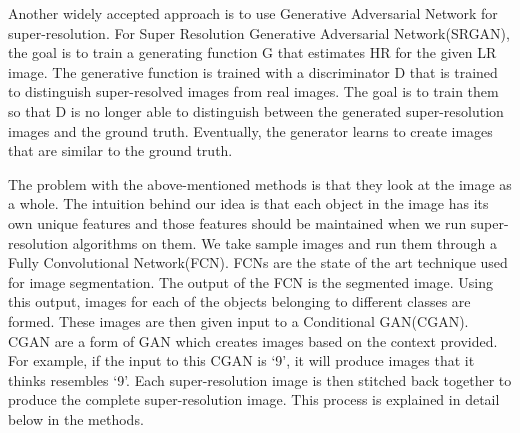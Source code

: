 Another widely accepted approach is to use Generative Adversarial Network for
super-resolution\cite{Ledig}. For Super Resolution Generative Adversarial Network(SRGAN),
the goal is to train a generating function G that estimates HR for the given LR
image. The generative function is trained with a discriminator D that is trained
to distinguish super-resolved images from real images. The goal is to train them
so that D is no longer able to distinguish between the generated
super-resolution images and the ground truth. Eventually, the generator learns
to create images that are similar to the ground truth.

The problem with the above-mentioned methods is that they look at the image as a
whole. The intuition behind our idea is that each object in the image has its
own unique features and those features should be maintained when we run
super-resolution algorithms on them. We take sample images and run them through
a Fully Convolutional Network(FCN). FCNs are the state of the art technique used
for image segmentation. The output of the FCN is the segmented image. Using this
output, images for each of the objects belonging to different classes are
formed. These images are then given input to a Conditional GAN(CGAN). CGAN are a
form of GAN which creates images based on the context provided. For example, if
the input to this CGAN is ‘9’, it will produce images that it thinks resembles
‘9’. Each super-resolution image is then stitched back together to produce the
complete super-resolution image. This process is explained in detail below in
the methods.
